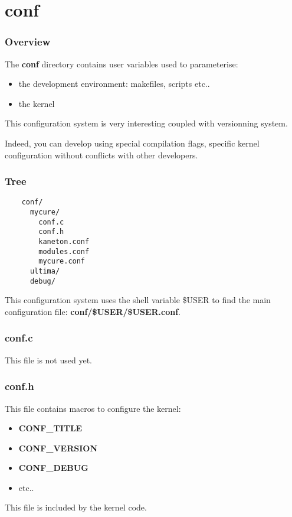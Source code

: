 \documentclass[8pt]{beamer}
\newcommand{\nl}[0]{\vspace{0.4cm}}
\begin{document}
%
%

\section{conf}


\begin{frame}
  \frametitle{Overview}

  The \textbf{conf} directory contains user variables used to parameterise:

  \begin{itemize}
    \item
      the development environment: makefiles, scripts etc..
    \item
      the kernel
  \end{itemize}

  \nl

  This configuration system is very interesting coupled with versionning
  system.

  \nl

  Indeed, you can develop using special compilation flags, specific kernel
  configuration without conflicts with other developers.
\end{frame}


\begin{frame}[containsverbatim]
  \frametitle{Tree}

  \begin{verbatim}
    conf/
      mycure/
        conf.c
        conf.h
        kaneton.conf
        modules.conf
        mycure.conf
      ultima/
      debug/
  \end{verbatim}

  This configuration system uses the shell variable \$USER to find
  the main configuration file: \textbf{conf/\$USER/\$USER.conf}.
\end{frame}


\begin{frame}
  \frametitle{conf.c}

  This file is not used yet.
\end{frame}


\begin{frame}
  \frametitle{conf.h}

  This file contains macros to configure the kernel:

  \begin{itemize}
    \item
      \textbf{CONF\_TITLE}
    \item
      \textbf{CONF\_VERSION}
    \item
      \textbf{CONF\_DEBUG}
    \item
      etc..
  \end{itemize}

  \nl

  This file is included by the kernel code.
\end{frame}
\end{document}
